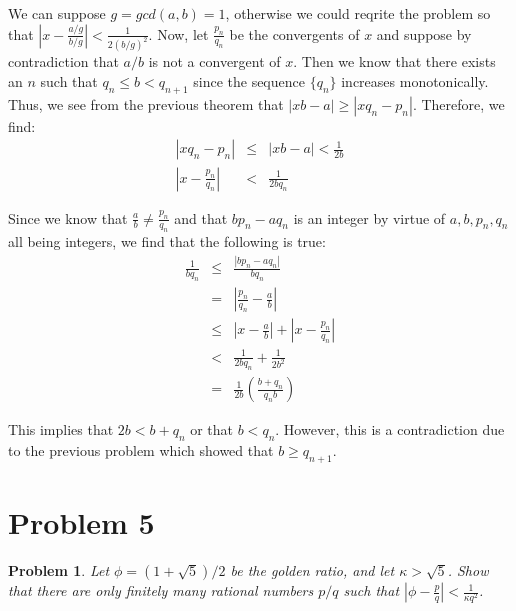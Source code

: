 \documentclass[psamsfonts]{amsart}
\newtheorem{prob}{Problem}[section]
\newenvironment{sol}{{\bfseries Solution}}{\qedsymbol}
\theoremstyle{definition}
\theoremstyle{remark}
\numberwithin{equation}{section}
\begin{document}
\begin{sol}
We can suppose $g= gcd(a,b) = 1$, otherwise we could reqrite the problem so that $|x - \frac{a/g}{b/g}| < \frac{1}{2(b/g)^2}$. Now, let $\frac{p_n}{q_n}$ be the convergents of $x$ and suppose by contradiction that $a/b$ is not a convergent of $x$. Then we know that there exists an $n$ such that $q_n \leq b < q_{n+1}$ since the sequence $\{q_n\}$ increases monotonically. Thus, we see from the previous theorem that $|xb - a| \geq |x q_n - p_n|$. Therefore, we find:
\begin{eqnarray}
|x q_n - p_n | &\leq& |xb - a| < \frac{1}{2b} \\
\left|x - \frac{p_n}{q_n} \right| &<& \frac{1}{2b q_n} 
\end{eqnarray}

Since we know that $\frac{a}{b} \neq \frac{p_n}{q_n}$ and that $b p_n - a q_n$ is an integer by virtue of $a,b,p_n, q_n$ all being integers, we find that the following is true:
\begin{eqnarray}
\frac{1}{bq_n} &\leq& \frac{ |b p_n - a q_n|}{b q_n} \\
&=& \left| \frac{p_n}{q_n} - \frac{a}{b} \right| \\
&\leq& \left| x- \frac{a}{b} \right| + \left| x - \frac{p_n}{q_n} \right| \\
&<& \frac{1}{2b q_n} + \frac{1}{2b^2} \\
&=& \frac{1}{2b} \left( \frac{b + q_n}{q_n b} \right) 
\end{eqnarray}

This implies that $2b < b + q_n$ or that $b < q_n$. However, this is a contradiction due to the previous problem which showed that $b \geq q_{n+1}$. 
\end{sol}

\section{Problem 5}

\begin{prob}
Let $\phi = (1 + \sqrt{5})/2$ be the golden ratio, and let $\kappa > \sqrt{5}$. Show that there are only finitely many rational numbers $p/q$ such that $|\phi - \frac{p}{q}| < \frac{1}{\kappa q^2}$. 
\end{prob}
\end{document}
